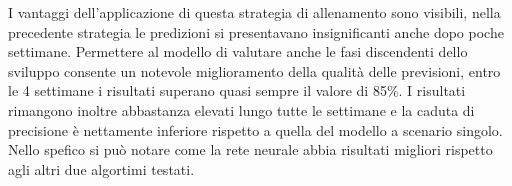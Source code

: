 \documentclass[%
    corpo=12pt,
    twoside,
    oldstyle,
    autoretitolo,
    greek,
    evenboxes,
]{toptesi}
\begin{document}
\begin{center}
   \label{tab:cross_version_hadoop}
\end{center}
I vantaggi dell'applicazione di questa strategia di allenamento sono visibili, nella precedente strategia le predizioni si presentavano insignificanti anche dopo poche settimane. Permettere al modello di valutare anche le fasi discendenti dello sviluppo consente un notevole miglioramento della qualità delle previsioni, entro le 4 settimane i risultati superano quasi sempre il valore di 85\%. I risultati rimangono inoltre abbastanza elevati lungo tutte le settimane e la caduta di precisione è nettamente inferiore rispetto a quella del modello a scenario singolo. Nello spefico si può notare come la rete neurale abbia risultati migliori rispetto agli altri due algortimi testati.
\end{document}
